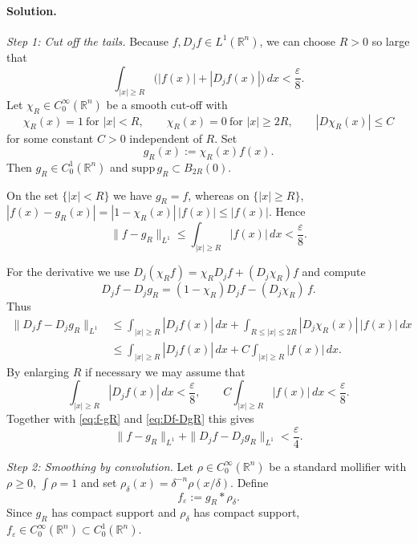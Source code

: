 \documentclass[12pt,a4paper]{article}
\theoremstyle{plain}
\theoremstyle{definition}
\theoremstyle{remark}
\theoremstyle{remark}
\begin{document}
\paragraph{Solution.}

\emph{Step 1: Cut off the tails.}
Because $f,D_j f\in L^1(\mathbb{R}^n)$, we can choose $R>0$ so large that
\begin{equation}\label{eq:tail-choice}
	\int_{|x|\ge R}\big(|f(x)|+|D_j f(x)|\big)\,dx < \frac{\varepsilon}{8}.
\end{equation}
Let $\chi_R\in C_0^\infty(\mathbb{R}^n)$ be a smooth cut-off with
\[
\chi_R(x)=1 \ \text{for } |x|<R, \qquad
\chi_R(x)=0 \ \text{for } |x|\ge 2R, \qquad
|D\chi_R(x)|\le C
\]
for some constant $C>0$ independent of $R$. Set
\[
g_R(x):=\chi_R(x)f(x).
\]
Then $g_R\in C_0^1(\mathbb{R}^n)$ and $\mathrm{supp}\,g_R\subset B_{2R}(0)$.

On the set $\{|x|<R\}$ we have $g_R=f$, whereas on $\{|x|\ge R\}$,
\(
|f(x)-g_R(x)| = |1-\chi_R(x)|\,|f(x)|
\le |f(x)|.
\)
Hence
\begin{equation}\label{eq:f-gR}
	\|f-g_R\|_{L^1}
	\le \int_{|x|\ge R}|f(x)|\,dx
	< \frac{\varepsilon}{8}.
\end{equation}

For the derivative we use $D_j(\chi_R f)=\chi_R D_j f +(D_j\chi_R)f$ and compute
\[
D_j f - D_j g_R = (1-\chi_R)D_j f - (D_j\chi_R)\,f.
\]
Thus
\begin{equation}\label{eq:Df-DgR}
	\begin{aligned}
		\|D_j f-D_j g_R\|_{L^1}
		&\le \int_{|x|\ge R}|D_j f(x)|\,dx
		+ \int_{R\le |x|\le 2R}|D_j\chi_R(x)|\,|f(x)|\,dx \\
		&\le \int_{|x|\ge R}|D_j f(x)|\,dx
		+ C\int_{|x|\ge R}|f(x)|\,dx.
	\end{aligned}
\end{equation}
By enlarging $R$ if necessary we may assume that
\[
\int_{|x|\ge R}|D_j f(x)|\,dx < \frac{\varepsilon}{8},
\qquad
C\int_{|x|\ge R}|f(x)|\,dx < \frac{\varepsilon}{8}.
\]
Together with \eqref{eq:f-gR} and \eqref{eq:Df-DgR} this gives
\[
\|f-g_R\|_{L^1} + \|D_j f-D_j g_R\|_{L^1} < \frac{\varepsilon}{4}.
\]

\emph{Step 2: Smoothing by convolution.}
Let $\rho\in C_0^\infty(\mathbb{R}^n)$ be a standard mollifier with $\rho\ge0$,
$\int\rho=1$ and set $\rho_\delta(x)=\delta^{-n}\rho(x/\delta)$. Define
\[
f_\varepsilon := g_R * \rho_\delta.
\]
Since $g_R$ has compact support and $\rho_\delta$ has compact support,
$f_\varepsilon\in C_0^\infty(\mathbb{R}^n)\subset C_0^1(\mathbb{R}^n)$.
\end{document}
